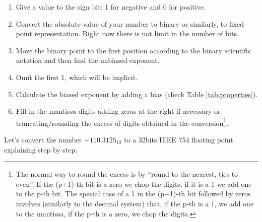 \begin{enumerate}
    \item Give a value to the sign bit: 1 for negative and 0 for positive.
    
    \item Convert the absolute value of your number to binary or similarly, to fixed-point representation. Right now there is not limit in the number of bits. 
      
    \item Move the binary point to the first position according to the binary scientific notation and then find the unbiased exponent.
    
    \item Omit the first 1, which will be implicit.
    
    \item Calculate the biased exponent by adding a bias (check Table \ref{tab:properties}).
    
    \item Fill in the mantissa digits adding zeros at the right if necessary or truncating/rounding the excess of digits obtained in the conversion\footnote{The normal way to round the excess is by ``round to the nearest, ties to even''. If the (p+1)-th bit is a zero we chop the digits, if it is a 1 we add one to the p-th bit. The special case of a 1 in the (p+1)-th bit followed by zeros involves (similarly to the decimal system) that, if the p-th is a 1, we add one to the mantissa, if the p-th is a zero, we chop the digits.}.
\end{enumerate}




Let's convert the number $-110.3125_{10}$ to a 32bits IEEE 754 floating point explaining step by step:

